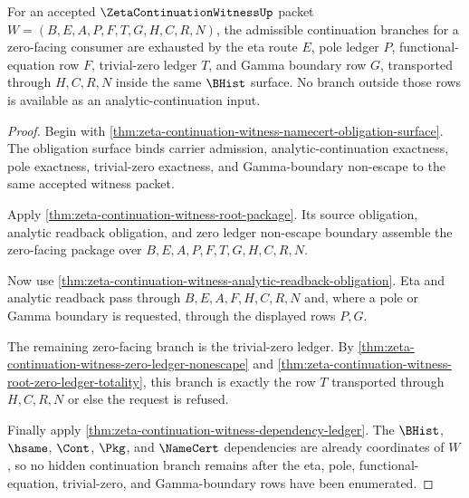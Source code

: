 \begin{theorem}
\label{thm:zeta-continuation-witness-eta-pole-functional-readiness}
For an accepted $\ZetaContinuationWitnessUp$ packet $W=(B,E,A,P,F,T,G,H,C,R,N)$, the admissible continuation branches for a zero-facing consumer are exhausted by the eta route $E$, pole ledger $P$, functional-equation row $F$, trivial-zero ledger $T$, and Gamma boundary row $G$, transported through $H,C,R,N$ inside the same $\BHist$ surface. No branch outside those rows is available as an analytic-continuation input.
\end{theorem}
\begin{proof}
Begin with \autoref{thm:zeta-continuation-witness-namecert-obligation-surface}. The obligation surface binds carrier admission, analytic-continuation exactness, pole exactness, trivial-zero exactness, and Gamma-boundary non-escape to the same accepted witness packet.

Apply \autoref{thm:zeta-continuation-witness-root-package}. Its source obligation, analytic readback obligation, and zero ledger non-escape boundary assemble the zero-facing package over $B,E,A,P,F,T,G,H,C,R,N$.

Now use \autoref{thm:zeta-continuation-witness-analytic-readback-obligation}. Eta and analytic readback pass through $B,E,A,F,H,C,R,N$ and, where a pole or Gamma boundary is requested, through the displayed rows $P,G$.

The remaining zero-facing branch is the trivial-zero ledger. By \autoref{thm:zeta-continuation-witness-zero-ledger-nonescape} and \autoref{thm:zeta-continuation-witness-root-zero-ledger-totality}, this branch is exactly the row $T$ transported through $H,C,R,N$ or else the request is refused.

Finally apply \autoref{thm:zeta-continuation-witness-dependency-ledger}. The $\BHist$, $\hsame$, $\Cont$, $\Pkg$, and $\NameCert$ dependencies are already coordinates of $W$, so no hidden continuation branch remains after the eta, pole, functional-equation, trivial-zero, and Gamma-boundary rows have been enumerated.
\end{proof}

